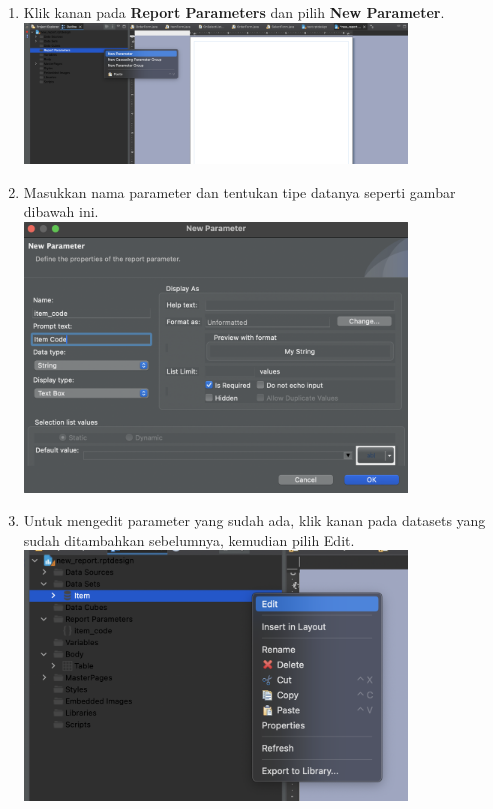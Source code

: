 \begin{enumerate}
	\item Klik kanan pada \textbf{Report Parameters} dan pilih \textbf{New Parameter}. \\
	\includegraphics[width=0.8\textwidth]{assets/pertemuan14/Parameters/birt-pre-report-parameters.png}
	
	\item Masukkan nama parameter dan tentukan tipe datanya seperti gambar dibawah ini. \\
	\includegraphics[width=0.8\textwidth]{assets/pertemuan14/Parameters/birt-new-parameter.png}

	\item Untuk mengedit parameter yang sudah ada, klik kanan pada datasets yang sudah ditambahkan sebelumnya, kemudian pilih Edit. \\
	\includegraphics[width=0.8\textwidth]{assets/pertemuan14/Parameters/birt-edit-data-set.png}
	

\end{enumerate}
